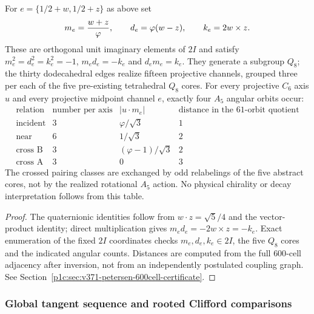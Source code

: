 \documentclass[11pt]{article}
\begin{document}
\begin{proposition}
\label{p1:prop:v371-petersen-q8-angular}
For $e=\{1/2+w,1/2+z\}$ as above set
\[
 m_e={w+z\over\varphi},\qquad
 d_e=\varphi(w-z),\qquad k_e=2w\times z.
\]
These are orthogonal unit imaginary elements of $2I$ and satisfy
$m_e^2=d_e^2=k_e^2=-1$, $m_ed_e=-k_e$ and $d_em_e=k_e$.
They generate a subgroup $Q_8$; the thirty dodecahedral edges realize
fifteen projective channels, grouped three per each of the five
pre-existing tetrahedral $Q_8$ cores. For every projective $C_6$ axis
$u$ and every projective midpoint channel $e$, exactly four $A_5$
angular orbits occur:
\[
\begin{array}{c|c|c|c}
\text{relation}&\text{number per axis}&|u\cdot m_e|&
\text{distance in the 61-orbit quotient}\\\hline
\text{incident}&3&\varphi/\sqrt3&1\\
\text{near}&6&1/\sqrt3&2\\
\text{cross B}&3&(\varphi-1)/\sqrt3&2\\
\text{cross A}&3&0&3
\end{array}
\]
The crossed pairing classes are exchanged by odd relabelings of the five
abstract cores, not by the realized rotational $A_5$ action. No
physical chirality or decay interpretation follows from this table.
\end{proposition}
\begin{proof}
The quaternionic identities follow from
$w\cdot z=\sqrt5/4$ and the vector-product identity; direct
multiplication gives $m_ed_e=-2w\times z=-k_e$. Exact enumeration
of the fixed $2I$ coordinates checks $m_e,d_e,k_e\in2I$, the five
$Q_8$ cores and the indicated angular counts. Distances are computed
from the full $600$-cell adjacency after inversion, not from an
independently postulated coupling graph. See
Section~\ref{p1c:sec:v371-petersen-600cell-certificate}.
\end{proof}

\subsubsection{Global tangent sequence and rooted Clifford comparisons}
\label{p1:sec:v371-petersen-tangent-sequence}
\end{document}
